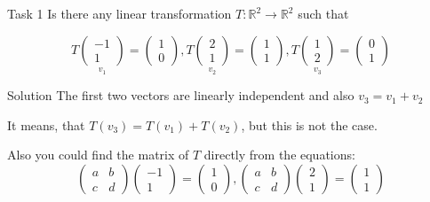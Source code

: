 \documentclass[fullscreen=true, bookmarks=true, hyperref={pdfencoding=unicode}]{beamer}
\begin{document}
\begin{frame}{Task 1}
  Is there any linear transformation $T: \mathbb{R}^2 \rightarrow \mathbb{R}^2$ such that

  $$T \underset{v_1}{\left(
    \begin{matrix}
      -1 \\ 1
    \end{matrix}\right)}
     = \begin{pmatrix}
       1 \\ 0
    \end{pmatrix},
  T \underset{v_2}{\left(\begin{matrix}
    2 \\ 1
  \end{matrix}\right)} 
     = \begin{pmatrix}
    1 \\ 1
  \end{pmatrix},
  T\underset{v_3}{\left(\begin{matrix}
    1 \\ 2
  \end{matrix}\right)}
   = \begin{pmatrix}
    0 \\ 1
  \end{pmatrix}$$
  \pause

  \begin{block}{Solution}
    The first two vectors are linearly independent and also $v_3 = v_1 + v_2$

    It means, that $T(v_3) = T(v_1)+T(v_2)$, but this is not the case.

    \pause
    Also you could find the matrix of $T$ directly from the equations:
    $$ \begin{pmatrix}
       a & b \\ 
       c & d
       \end{pmatrix} 
       \begin{pmatrix}
        -1 \\ 1
       \end{pmatrix} =  
       \begin{pmatrix}
        1 \\ 0
       \end{pmatrix} ,
       \begin{pmatrix}
        a & b \\ 
        c & d
        \end{pmatrix} 
        \begin{pmatrix}
         2 \\ 1
        \end{pmatrix} =  
        \begin{pmatrix}
         1 \\ 1
        \end{pmatrix}
        $$
  \end{block}

\end{frame}
\end{document}
